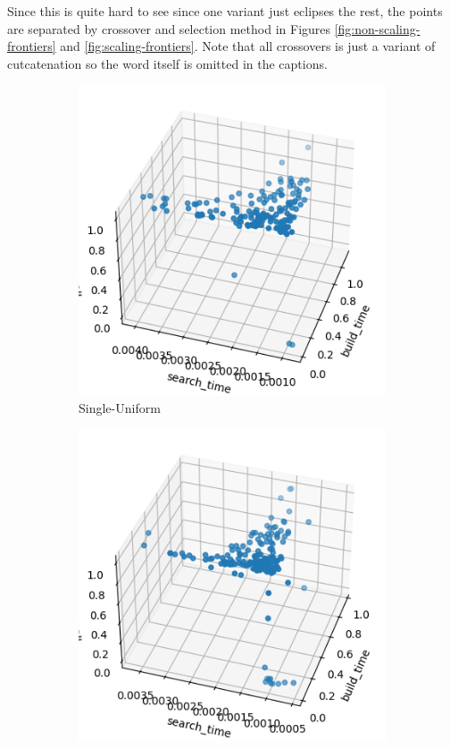 Since this is quite hard to see since one variant just eclipses the rest, the points are separated by crossover and selection method in Figures \ref{fig:non-scaling-frontiers} and \ref{fig:scaling-frontiers}. Note that all crossovers is just a variant of cutcatenation so the word itself is omitted in the captions.

\begin{figure}[ht]
    \centering
    \hfill
    \begin{subfigure}{0.24\textwidth}
        \includegraphics[width=\textwidth]{../images/report/non-scaling-frontier-single-unif.png}
        \caption{Single-Uniform}
    \end{subfigure}
    \hfill
    \begin{subfigure}{0.24\textwidth}
        \includegraphics[width=\textwidth]{../images/report/non-scaling-frontier-single-tour.png}

\end{subfigure}
\end{figure}
